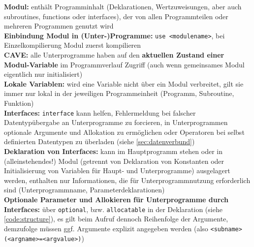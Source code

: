 \documentclass[a4paper, twocolumn]{scrarticle}
\begin{document}
\textbf{Modul:} enthält Programminhalt (Deklarationen, Wertzuweisungen, aber auch subroutines, functions oder interfaces), der von allen Programmteilen oder mehreren Programmen genutzt wird\\
\textbf{Einbindung Modul in (Unter-)Programme:} \lstinline|use <modulename>|, bei Einzelkompilierung Modul zuerst kompilieren\\
\textbf{CAVE:} alle Unterprogramme haben auf den \textbf{aktuellen Zustand einer Modul-Variable} im Programmverlauf Zugriff (auch wenn gemeinsames Modul eigentlich nur initialisiert)\\
\textbf{Lokale Variablen:} wird eine Variable nicht über ein Modul \glqq verbreitet\grqq, gilt sie immer nur lokal in der jeweiligen Programmeinheit (Programm, Subroutine, Funktion)\\
\textbf{Interfaces:} \lstinline|interface| kann helfen, Fehlermeldung bei falscher Datentypübergabe an Unterprogramme zu forcieren, in Unterprogrammen optionale Argumente und Allokation zu ermöglichen oder Operatoren bei selbst definierten Datentypen zu überladen (siehe \cref{sec:datenverbund})\\
\textbf{Deklaration von Interfaces:} kann im Hauptprogramm stehen oder in (alleinstehendes!) Modul (getrennt von Deklaration von Konstanten oder Initialisierung von Variablen für Haupt- und Unterprogramme) ausgelagert werden, enthalten nur Informationen, die für Unterprogrammnutzung erforderlich sind (Unterprogrammname, Parameterdeklarationen)\\
\textbf{Optionale Parameter und Allokieren für Unterprogramme durch Interfaces:} über \lstinline|optional|, bzw. \lstinline|allocatable| in der Deklaration (siehe \cref{code:structure}), es gilt beim Aufruf dennoch Reihenfolge der Argumente, demzufolge müssen ggf. Argumente explizit angegeben werden (also \lstinline|<subname>(<argname>=<argvalue>)|)\\
\end{document}
